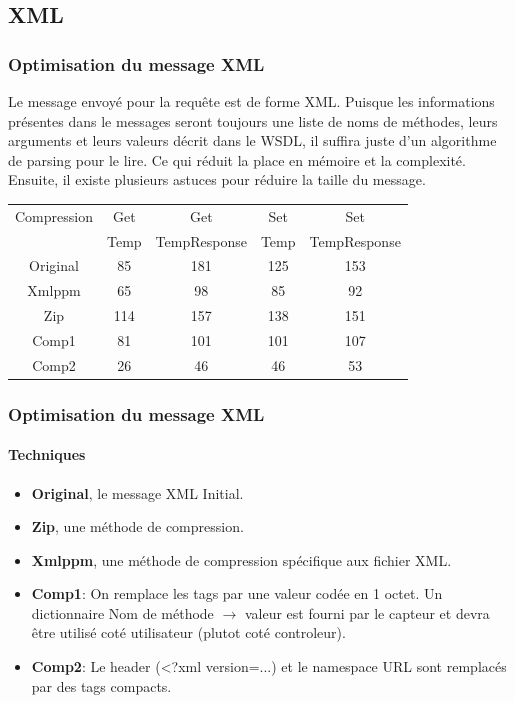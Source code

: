 \subsection{XML}
\begin{frame}
 \frametitle{Optimisation du message XML}
 Le message envoyé pour la requête est de forme XML.
 Puisque les informations présentes dans le messages seront toujours une liste de noms de méthodes, leurs arguments et leurs valeurs décrit dans le WSDL, il suffira juste d'un algorithme de parsing pour le lire.
 Ce qui réduit la place en mémoire et la complexité.\\
 \vspace{4mm}
 Ensuite, il existe plusieurs astuces pour réduire la taille du message.\\
 \begin{center}
  \begin{tabular}{|c|c|c|c|c|}
   \hline
   Compression & Get & Get & Set & Set\\
   ~ & Temp & TempResponse & Temp & TempResponse\\
   \hline
   Original & 85 & 181 & 125 & 153\\
   \hline
   Xmlppm & 65 & 98 & 85 & 92\\
   Zip & 114 & 157 & 138 & 151\\
   \hline
   Comp1 & 81 & 101 & 101 & 107\\
   Comp2 & 26 & 46 & 46 & 53\\
   \hline
  \end{tabular}
 \end{center}
\end{frame}

\begin{frame}
 \frametitle{Optimisation du message XML}
 \framesubtitle{Techniques}
 \begin{itemize}
  \item \textbf{Original}, le message XML Initial.
  \item \textbf{Zip}, une méthode de compression.
  \item \textbf{Xmlppm}, une méthode de compression spécifique aux fichier XML.
  \item \textbf{Comp1}: On remplace les tags par une valeur codée en 1 octet.
  Un dictionnaire Nom de méthode $\rightarrow$ valeur est fourni par le capteur et devra être utilisé coté utilisateur (plutot coté controleur).
  \item \textbf{Comp2}: Le header (<?xml version=...) et le namespace URL sont remplacés par des tags compacts.
 \end{itemize}
\end{frame}
